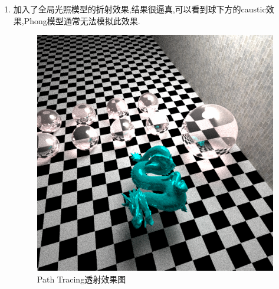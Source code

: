 \begin{enumerate}
  \item 加入了全局光照模型的折射效果,结果很逼真,可以看到球下方的caustic效果,Phong模型通常无法模拟此效果.
    \begin{figure}[H]
      \centering
      \includegraphics[scale=0.5]{img/caustic.png}
      \caption{Path Tracing透射效果图\label{fig:pt_transm}}
    \end{figure}


\end{enumerate}
